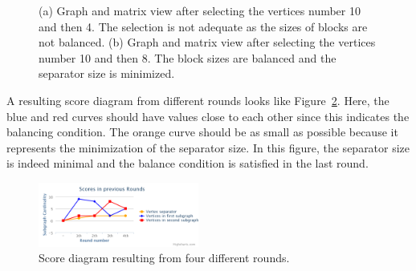 \documentclass[12pt, twoside,a4paper,toc=bibliography]{scrbook}
\newcommand{\figref}[1]{Figure~\protect\ref{#1}}
\begin{document}
\begin{figure}
\centering
{}
\hfill
{}
\caption{
(a) Graph and matrix view after selecting the vertices number 10 and then 4.
The selection is not adequate as the sizes of blocks are not balanced.
(b) Graph and matrix view after selecting the vertices number 10 and then 8. The block sizes are balanced and the separator size is minimized.}
\label{selected_4_10_8_10}
\end{figure}

A resulting score diagram from different rounds looks
like \figref{diagram}. Here, the blue and red curves should have
values close to each other since this indicates the balancing condition.
The orange curve should be as small as possible
because it represents the minimization of the separator size.
In this figure, the separator size is indeed minimal and the
balance condition is satisfied in the last round.
\begin{figure}
\centering
\includegraphics[width=0.47\textwidth]{diagram}
\caption{Score diagram resulting from four different rounds.}
\label{diagram}
\end{figure}
\end{document}
